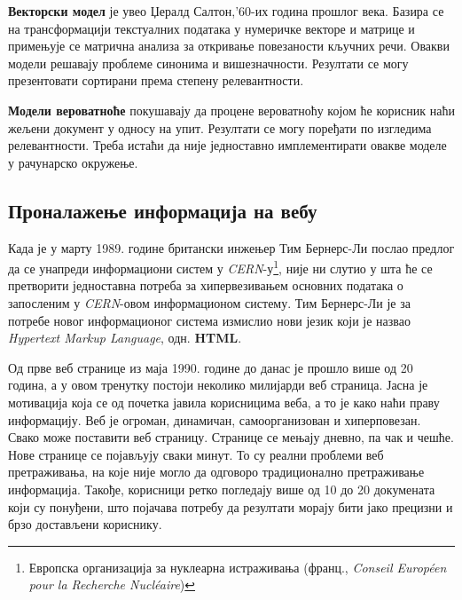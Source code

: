 \textbf{Векторски модел} је увео Џералд Салтон,'60-их година прошлог века. Базира се на трансформацији текстуалних података у нумеричке векторе и матрице и примењује се матрична анализа за откривање повезаности кључних речи. Овакви модели решавају проблеме синонима и вишезначности. Резултати се могу презентовати сортирани према степену релевантности.\cite{berry2005understanding}

\textbf{Модели вероватноће} покушавају да процене вероватноћу којом ће корисник наћи жељени документ у односу на упит. Резултати се могу поређати по изгледима релевантности. Треба истаћи да није једноставно имплементирати овакве моделе у рачунарско окружење.\cite{berry2005understanding}

\subsection{Проналажење информација на вебу}
Када је у марту 1989. године британски инжењер Тим Бернерс-Ли послао предлог\cite{proposal} да се унапреди информациони систем у \emph{CERN}-у\footnote{Европска организација за нуклеарна истраживања (франц., \emph{Conseil Européen pour la Recherche Nucléaire})}, није ни слутио у шта ће се претворити једноставна потреба за хипервезивањем основних података о запосленим у \emph{CERN}-овом информационом систему\cite{berners2004weaving}. Тим Бернерс-Ли је за потребе новог информационог система измислио нови језик који је назвао \emph{Hypertext Markup Language}, одн. \textbf{HTML}.

Од прве веб странице из маја 1990. године до данас је прошло више од 20 година, а у овом тренутку постоји неколико милијарди веб страница. Јасна је мотивација која се од почетка јавила корисницима веба, а то је како наћи праву информацију. Веб је огроман, динамичан, самоорганизован и хиперповезан.\cite[Ch 1.3.1]{langville2011google} Свако може поставити веб страницу. Странице се мењају дневно, па чак и чешће. Нове странице се појављују сваки минут. То су реални проблеми веб претраживања, на које није могло да одговоро традиционално претраживање информација. Такође, корисници ретко погледају више од 10 до 20 докумената који су понуђени, што појачава потребу да резултати морају бити јако прецизни и брзо достављени кориснику.

